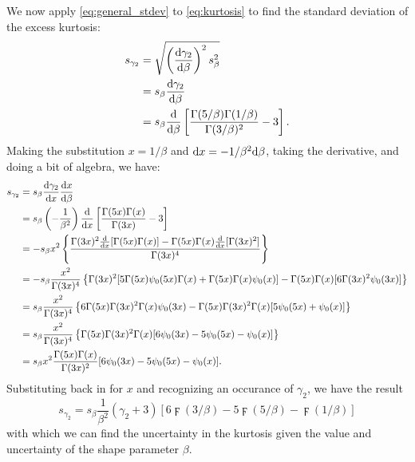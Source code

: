 We now apply \eqref{eq:general_stdev} to \eqref{eq:kurtosis} to find the standard deviation of the excess kurtosis:
\begin{align} \label{eq:kurt_err_partial1}
	s_{\gamma_{2}} &= \sqrt{ \left( \frac{{\rm {d}} \gamma_{2}}{{\rm {d}} \beta} \right)^{2} s_{\beta}^{2} } \\
		&= s_{\beta} \frac{{\rm {d}} \gamma_{2}}{{\rm {d}} \beta} \\
		&= s_{\beta} \frac{{\rm {d}}}{{\rm {d}} \beta} \left[ \frac{\Gamma(5/\beta) \Gamma(1/\beta)}{\Gamma(3/\beta)^{2}} - 3 \right].
\end{align}
Making the substitution $x = 1 / \beta$ and ${\rm {d}} x = - 1 / \beta^{2} {\rm {d}} \beta$, taking the derivative, and doing a bit of algebra, we have:
\begin{align} \label{eq:kurt_err_partial2}
	s_{\gamma_{2}} &= s_{\beta} \frac{{\rm {d}} \gamma_{2}}{{\rm {d}} x} \frac{{\rm {d}} x}{{\rm {d}} \beta} \\
		&= s_{\beta} \left( -\frac{1}{\beta^{2}} \right) \frac{{\rm {d}}}{{\rm {d}} x} \left[ \frac{\Gamma(5x) \Gamma(x)}{\Gamma(3x)} - 3 \right] \\
		&= -s_{\beta} x^{2} \left\{ \frac{\Gamma(3x)^{2} \frac{{\rm {d}}}{{\rm {d}} x} [\Gamma(5x) \Gamma(x)] - \Gamma(5x) \Gamma(x) \frac{{\rm {d}}}{{\rm {d}} x} [\Gamma(3x)^{2}]}{\Gamma(3x)^{4}} \right\} \\
		&= -s_{\beta} \frac{x^{2}}{\Gamma(3x)^{4}} \left\{ \Gamma(3x)^{2} [5\Gamma(5x) {\psi_{0}}(5x) \Gamma(x) + \Gamma(5x) \Gamma(x) {\psi_{0}}(x)] - \Gamma(5x) \Gamma(x) [6\Gamma(3x)^{2} {\psi_{0}}(3x)] \right\} \\
		&= s_{\beta} \frac{x^{2}}{\Gamma(3x)^{4}} \left\{ 6\Gamma(5x) \Gamma(3x)^{2} \Gamma(x) {\psi_{0}}(3x) - \Gamma(5x) \Gamma(3x)^{2} \Gamma(x) [5{\psi_{0}}(5x) + {\psi_{0}}(x)] \right\} \\
		&= s_{\beta} \frac{x^{2}}{\Gamma(3x)^{4}} \left\{ \Gamma(5x) \Gamma(3x)^{2} \Gamma(x) [6{\psi_{0}}(3x) - 5{\psi_{0}}(5x) - {\psi_{0}}(x)] \right\} \\
		&= s_{\beta} x^{2} \frac{\Gamma(5x) \Gamma(x)}{\Gamma(3x)^{2}} [6{\psi_{0}}(3x) - 5{\psi_{0}}(5x) - {\psi_{0}}(x)].
\end{align}
Substituting back in for $x$ and recognizing an occurance of $\gamma_{2}$, we have the result
\begin{equation} \label{eq:kurt_err}
	s_{\gamma_{2}} = s_{\beta} \frac{1}{\beta^{2}} \left( \gamma_{2} + 3 \right) \left[ 6 \digamma(3/\beta) - 5 \digamma(5/\beta) - \digamma(1/\beta) \right]
\end{equation}
with which we can find the uncertainty in the kurtosis given the value and uncertainty of the shape parameter $\beta$.




